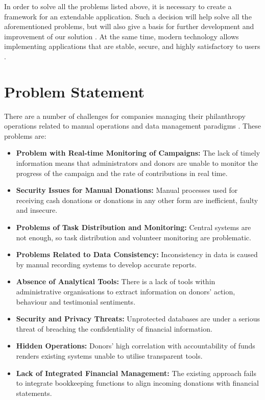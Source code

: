 \documentclass{thesis-library}
\begin{document}
In order to solve all the problems listed above, it is necessary to create a framework for an extendable application. Such a decision will help solve all the aforementioned problems, but will also give a basis for further development and improvement of our solution \cite{jones2023modern}. At the same time, modern technology allows implementing applications that are stable, secure, and highly satisfactory to users \cite{wang2021enhancing}.

\section{Problem Statement}

There are a number of challenges for companies managing their philanthropy operations related to manual operations and data management paradigms \cite{barnes2018rise,sander2021digital}. These problems are:

\begin{itemize}
    \item \textbf{Problem with Real-time Monitoring of Campaigns:} The lack of timely information means that administrators and donors are unable to monitor the progress of the campaign and the rate of contributions in real time.
    \item \textbf{Security Issues for Manual Donations:} Manual processes used for receiving cash donations or donations in any other form are inefficient, faulty and insecure.
    \item \textbf{Problems of Task Distribution and Monitoring:} Central systems are not enough, so task distribution and volunteer monitoring are problematic.
    \item \textbf{Problems Related to Data Consistency:} Inconsistency in data is caused by manual recording systems to develop accurate reports.
    \item \textbf{Absence of Analytical Tools:} There is a lack of tools within administrative organisations to extract information on donors' action, behaviour and testimonial sentiments.
    \item \textbf{Security and Privacy Threats:} Unprotected databases are under a serious threat of breaching the confidentiality of financial information.
    \item \textbf{Hidden Operations:} Donors' high correlation with accountability of funds renders existing systems unable to utilise transparent tools.
    \item \textbf{Lack of Integrated Financial Management:} The existing approach fails to integrate bookkeeping functions to align incoming donations with financial statements.
\end{itemize}
\end{document}
